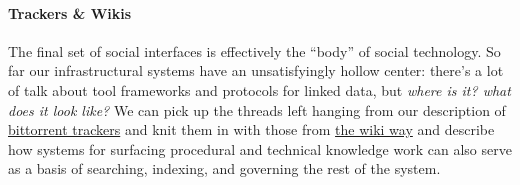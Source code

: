 \documentclass[10pt]{tufte-book}
\begin{document}
\paragraph{Trackers \& Wikis}

The final set of social interfaces is effectively the ``body'' of social
technology. So far our infrastructural systems have an unsatisfyingly
hollow center: there's a lot of talk about tool frameworks and protocols
for linked data, but \emph{where is it? what does it look like?} We can
pick up the threads left hanging from our description of
\protect\hyperlink{archives-need-communities}{bittorrent trackers} and
knit them in with those from \protect\hyperlink{the-wiki-way}{the wiki
way} and describe how systems for surfacing procedural and technical
knowledge work can also serve as a basis of searching, indexing, and
governing the rest of the system.
\end{document}
